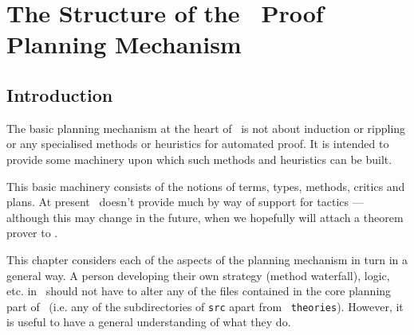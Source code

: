 \chapter{The Structure of the \lclam\ Proof Planning
Mechanism}
\label{core}

\section{Introduction}
The basic planning mechanism at the heart of \lclam\ is not about
induction or rippling or any
specialised methods or heuristics for automated proof.  It is intended
to provide some machinery upon which such methods and
heuristics can be built.

This basic machinery consists of the notions of terms,
types, methods, critics and
plans.  At present \lclam\ doesn't provide much by
way of support for tactics --- although this may change
in the future, when we hopefully will attach a theorem prover to
\lclam.

This chapter considers each of the aspects of the planning mechanism
in turn in a general way.  A person developing their own strategy
 (method waterfall),
logic, etc. in \lclam\ should not have to
alter any of the files contained in the core planning part of \lclam\ 
(i.e. any of the subdirectories of {\tt src} apart from {\tt
  theories}).  However, it is useful to have a general understanding
of what they do.


